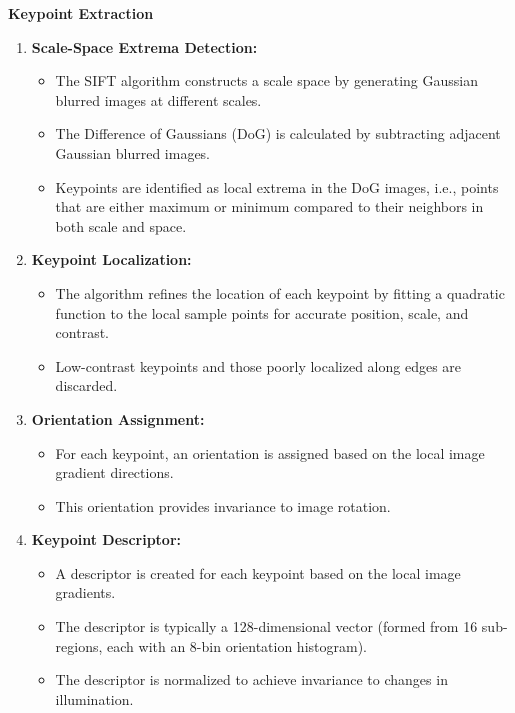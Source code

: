 \documentclass{article}
\begin{document}
\textbf{Keypoint Extraction}
\begin{enumerate}
    \item \textbf{Scale-Space Extrema Detection:}
    \begin{itemize}
        \item The SIFT algorithm constructs a scale space by generating Gaussian blurred images at different scales.
        \item The Difference of Gaussians (DoG) is calculated by subtracting adjacent Gaussian blurred images.
        \item Keypoints are identified as local extrema in the DoG images, i.e., points that are either maximum or minimum compared to their neighbors in both scale and space.
    \end{itemize}
    
    \item \textbf{Keypoint Localization:}
    \begin{itemize}
        \item The algorithm refines the location of each keypoint by fitting a quadratic function to the local sample points for accurate position, scale, and contrast.
        \item Low-contrast keypoints and those poorly localized along edges are discarded.
    \end{itemize}
    
    \item \textbf{Orientation Assignment:}
    \begin{itemize}
        \item For each keypoint, an orientation is assigned based on the local image gradient directions.
        \item This orientation provides invariance to image rotation.
    \end{itemize}
    
    \item \textbf{Keypoint Descriptor:}
    \begin{itemize}
        \item A descriptor is created for each keypoint based on the local image gradients.
        \item The descriptor is typically a 128-dimensional vector (formed from 16 sub-regions, each with an 8-bin orientation histogram).
        \item The descriptor is normalized to achieve invariance to changes in illumination.
    \end{itemize}
\end{enumerate}
\end{document}
